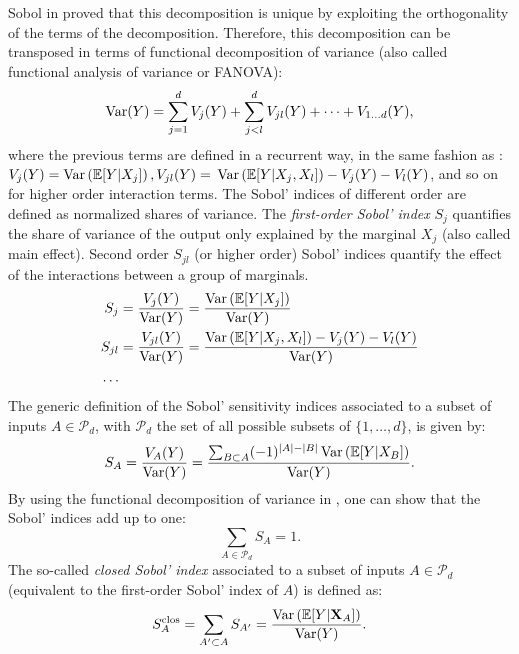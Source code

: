 Sobol in \citet{sobol_1993} proved that this decomposition is unique by exploiting the orthogonality of the terms of the decomposition. 
Therefore, this decomposition can be transposed in terms of functional decomposition of variance (also called functional analysis of variance or FANOVA):
\begin{equation}
    \operatorname{Var}(Y) = \sum_{j=1}^{d} V_j(Y)  + \sum_{j<l}^{d} V_{jl}(Y) + \dots + V_{1 \dots d}(Y), 
    \label{eq:fanova}
\end{equation}
where the previous terms are defined in a recurrent way, in the same fashion as :  $V_j(Y) = \operatorname{Var}\left(\mathbb{E}[Y|X_j]\right), V_{jl}(Y) =$ \allowbreak $\operatorname{Var}\left(\mathbb{E}[Y|X_j, X_l]\right) - V_j(Y) - V_l(Y)$, and so on for higher order interaction terms. 
The Sobol' indices of different order are defined as normalized shares of variance. 
The \textit{first-order Sobol' index} $S_j$ quantifies the share of variance of the output only explained by the marginal $X_j$ (also called main effect). 
Second order $S_{jl}$ (or higher order) Sobol' indices quantify the effect of the interactions between a group of marginals. 
\begin{subequations}
    \begin{align}
        S_j &= \frac{V_j(Y)}{\operatorname{Var}(Y)} = \frac{\operatorname{Var}\left(\mathbb{E}[Y|X_j]\right)}{\operatorname{Var}(Y)}\\
        S_{jl} &= \frac{V_{jl}(Y)}{\operatorname{Var}(Y)} = \frac{\operatorname{Var}\left(\mathbb{E}[Y|X_j, X_l]\right) - V_j(Y) - V_l(Y)}{\operatorname{Var}(Y)}\\
        \dots
        \label{eq:sobol_first}
    \end{align}
\end{subequations}
The generic definition of the Sobol' sensitivity indices associated to a subset of inputs $A \in \mathcal{P}_d$, with $\mathcal{P}_d$ the set of all possible subsets of $\{1, \dots, d\}$, is given by:
\begin{equation}
    S_A = \frac{V_A(Y)}{\operatorname{Var}(Y)} = \frac{\sum_{B \subset A} (-1)^{|A| - |B|} \operatorname{Var}\left(\mathbb{E}[Y|X_B]\right)}{\operatorname{Var}(Y)}.
    \label{eq:sobol}
\end{equation}
By using the functional decomposition of variance in , one can show that the Sobol' indices add up to one: 
\begin{equation}
    \sum_{A \in \mathcal{P}_d} S_A = 1.
\end{equation}
The so-called \textit{closed Sobol' index} associated to a subset of inputs $A \in \mathcal{P}_d$ (equivalent to the first-order Sobol' index of $A$) is defined as: 
\begin{equation}
    S_A^{\mathrm{clos}} = \sum_{A' \subset A} S_{A'} = \frac{\operatorname{Var}\left(\mathbb{E}[Y|{\bf X}_{A}]\right)}{\operatorname{Var}(Y)}.
    \label{eq:sobol_clos}
\end{equation}

